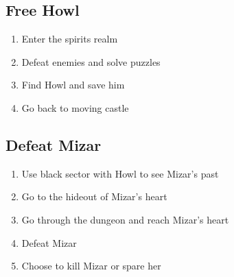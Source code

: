 \subsection{Free Howl}
\begin{enumerate}
\item Enter the spirits realm
\item Defeat enemies and solve puzzles
\item Find Howl and save him
\item Go back to moving castle
\end{enumerate}

\subsection{Defeat Mizar}
\begin{enumerate}
\item Use black sector with Howl to see Mizar’s past
\item Go to the hideout of Mizar’s heart
\item Go through the dungeon and reach Mizar’s heart
\item Defeat Mizar
\item Choose to kill Mizar or spare her
\end{enumerate}
